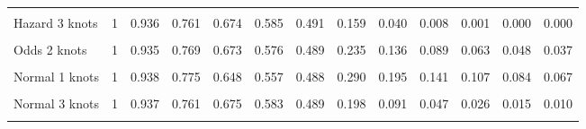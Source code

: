 \documentclass[
]{article}
\begin{document}
\begin{table}[H]
{\begin{tabular}[t]{lrrrrrrrrrrrr}
\cellcolor{gray!10}{Hazard 2 knots} & \cellcolor{gray!10}{1} & \cellcolor{gray!10}{0.935} & \cellcolor{gray!10}{0.766} & \cellcolor{gray!10}{0.673} & \cellcolor{gray!10}{0.579} & \cellcolor{gray!10}{0.490} & \cellcolor{gray!10}{0.184} & \cellcolor{gray!10}{0.061} & \cellcolor{gray!10}{0.018} & \cellcolor{gray!10}{0.005} & \cellcolor{gray!10}{0.001} & \cellcolor{gray!10}{0.000}\\
Hazard 3 knots & 1 & 0.936 & 0.761 & 0.674 & 0.585 & 0.491 & 0.159 & 0.040 & 0.008 & 0.001 & 0.000 & 0.000\\
\cellcolor{gray!10}{Odds 1 knots} & \cellcolor{gray!10}{1} & \cellcolor{gray!10}{0.939} & \cellcolor{gray!10}{0.778} & \cellcolor{gray!10}{0.648} & \cellcolor{gray!10}{0.556} & \cellcolor{gray!10}{0.489} & \cellcolor{gray!10}{0.301} & \cellcolor{gray!10}{0.213} & \cellcolor{gray!10}{0.162} & \cellcolor{gray!10}{0.131} & \cellcolor{gray!10}{0.109} & \cellcolor{gray!10}{0.093}\\
Odds 2 knots & 1 & 0.935 & 0.769 & 0.673 & 0.576 & 0.489 & 0.235 & 0.136 & 0.089 & 0.063 & 0.048 & 0.037\\
\cellcolor{gray!10}{Odds 3 knots} & \cellcolor{gray!10}{1} & \cellcolor{gray!10}{0.937} & \cellcolor{gray!10}{0.761} & \cellcolor{gray!10}{0.675} & \cellcolor{gray!10}{0.583} & \cellcolor{gray!10}{0.489} & \cellcolor{gray!10}{0.206} & \cellcolor{gray!10}{0.108} & \cellcolor{gray!10}{0.065} & \cellcolor{gray!10}{0.044} & \cellcolor{gray!10}{0.032} & \cellcolor{gray!10}{0.024}\\
Normal 1 knots & 1 & 0.938 & 0.775 & 0.648 & 0.557 & 0.488 & 0.290 & 0.195 & 0.141 & 0.107 & 0.084 & 0.067\\
\cellcolor{gray!10}{Normal 2 knots} & \cellcolor{gray!10}{1} & \cellcolor{gray!10}{0.930} & \cellcolor{gray!10}{0.773} & \cellcolor{gray!10}{0.669} & \cellcolor{gray!10}{0.572} & \cellcolor{gray!10}{0.489} & \cellcolor{gray!10}{0.240} & \cellcolor{gray!10}{0.135} & \cellcolor{gray!10}{0.083} & \cellcolor{gray!10}{0.054} & \cellcolor{gray!10}{0.037} & \cellcolor{gray!10}{0.027}\\
Normal 3 knots & 1 & 0.937 & 0.761 & 0.675 & 0.583 & 0.489 & 0.198 & 0.091 & 0.047 & 0.026 & 0.015 & 0.010\\
\cellcolor{gray!10}{Mixture cure Weibull} & \cellcolor{gray!10}{1} & \cellcolor{gray!10}{0.928} & \cellcolor{gray!10}{0.804} & \cellcolor{gray!10}{0.676} & \cellcolor{gray!10}{0.563} & \cellcolor{gray!10}{0.475} & \cellcolor{gray!10}{0.319} & \cellcolor{gray!10}{0.310} & \cellcolor{gray!10}{0.309} & \cellcolor{gray!10}{0.309} & \cellcolor{gray!10}{0.309} & \cellcolor{gray!10}{0.309}\\

\end{tabular}}
\end{table}
\end{document}
